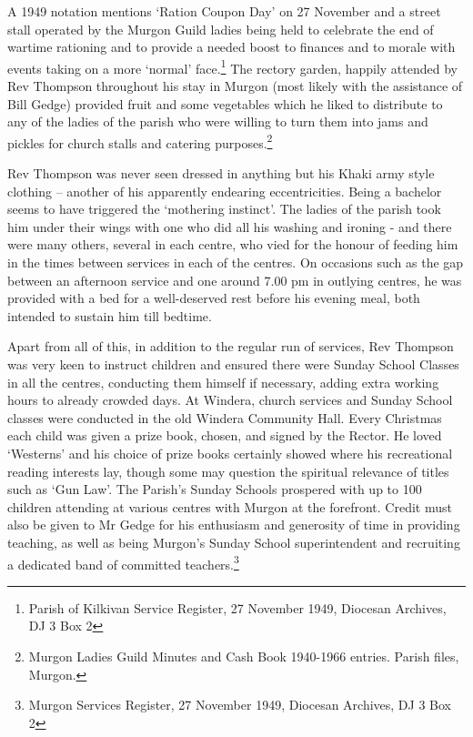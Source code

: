 A 1949 notation mentions `Ration Coupon Day' on 27 November and a street stall operated by the Murgon Guild ladies being held to celebrate the end of wartime rationing and to provide a needed boost to finances and to morale with events taking on a more `normal' face.\footnote{Parish of Kilkivan Service Register, 27 November 1949, Diocesan Archives, DJ 3 Box 2} The rectory garden, happily attended by Rev Thompson throughout his stay in Murgon (most likely with the assistance of Bill Gedge) provided fruit and some vegetables which he liked to distribute to any of the ladies of the parish who were willing to turn them into jams and pickles for church stalls and catering purposes.\footnote{Murgon Ladies Guild Minutes and Cash Book 1940-1966 entries. Parish files, Murgon.}

Rev Thompson was never seen dressed in anything but his Khaki army style clothing -- another of his apparently endearing eccentricities. Being a bachelor seems to have triggered the `mothering instinct'. The ladies of the parish took him under their wings with one who did all his washing and ironing - and there were many others, several in each centre, who vied for the honour of feeding him in the times between services in each of the centres. On occasions such as the gap between an afternoon service and one around 7.00 pm in outlying centres, he was provided with a bed for a well-deserved rest before his evening meal, both intended to sustain him till bedtime.

Apart from all of this, in addition to the regular run of services, Rev Thompson was very keen to instruct children and ensured there were Sunday School Classes in all the centres, conducting them himself if necessary, adding extra working hours to already crowded days. At Windera, church services and Sunday School classes were conducted in the old Windera Community Hall. Every Christmas each child was given a prize book, chosen, and signed by the Rector. He loved `Westerns' and his choice of prize books certainly showed where his recreational reading interests lay, though some may question the spiritual relevance of titles such as `Gun Law'. The Parish's Sunday Schools prospered with up to 100 children attending at various centres with Murgon at the forefront. Credit must also be given to Mr Gedge for his enthusiasm and generosity of time in providing teaching, as well as being Murgon's Sunday School superintendent and recruiting a dedicated band of committed teachers.\footnote{Murgon Services Register, 27 November 1949, Diocesan Archives, DJ 3 Box 2}

